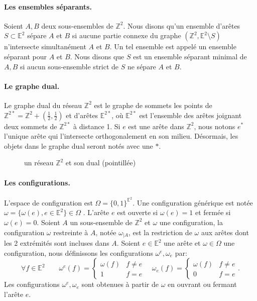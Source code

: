 \documentclass[titlepage,a4paper,12pt]{article}
\begin{document}
\paragraph{Les ensembles séparants.} Soient $A,B$ deux sous-ensembles de $\mathbb{Z}^2$. Nous disons qu'un ensemble d'arêtes $S\subset \mathbb{E}^2$ sépare $A$ et $B$ si aucune partie connexe du graphe $(\mathbb{Z}^2,\mathbb{E}^2 \setminus S)$ n'intersecte simultanément $A$ et $B$. Un tel ensemble est appelé un ensemble séparant pour $A$ et $B$. Nous disons que $S$ est un ensemble séparant minimal de $A,B$ si aucun sous-ensemble strict de $S$ ne sépare $A$ et $B$.

\paragraph{Le graphe dual.}Le graphe dual du réseau $\mathbb{Z}^2$ est le graphe de sommets les points de $ \mathbb{Z}^{2*} = \mathbb{Z}^2+(\frac{1}{2},\frac{1}{2})$ et d'arêtes $\mathbb{E}^{2*}$, où $\mathbb{E}^{2*}$ est l'ensemble des arêtes joignant deux sommets de $\mathbb{Z}^{2*}$ à distance 1. Si $e$ est une arête dans $\mathbb{Z}^2$, nous notons $e^*$ l'unique arête qui l'intersecte orthogonalement en son milieu. Désormais, les objets dans le graphe dual seront notés avec une $*$.
\begin{figure}[h]
\center
{}
\caption{un réseau $\mathbb{Z}^2$ et son dual (pointillée)}
\end{figure}

\paragraph{Les configurations.} L'espace de configuration est $\Omega = \{0,1\}^{\mathbb{E}^2}$. Une configuration générique est notée $\omega = \{\omega(e), e\in \mathbb{E}^2\} \in \Omega$ . L'arête $e$ est ouverte si $\omega(e) = 1$ et fermée si $\omega(e)= 0$. 
Soient $A$ un sous-ensemble de $\mathbb{Z}^2$ et $\omega$ une configuration, la configuration $\omega$ restreinte à $A$, notée $\omega_{\mid A}$, est la restriction de $\omega$ aux arêtes dont les 2 extrémités sont incluses dans $A$.
Soient $e\in \mathbb{E}^2$ une arête et $\omega\in \Omega$ une configuration, nous définissons les configurations $\omega^e,\omega_e$ par:
$$
 \forall f\in \mathbb{E}^2 \qquad\omega^e(f) = \left\lbrace \begin{array}{cc}
	\omega(f) & f\neq e \\
	1 & f=e 
 \end{array}\right. \quad
 \omega_e(f) = \left\lbrace \begin{array}{cc}
	\omega(f) & f\neq e \\
	0 & f=e
 \end{array}\right..
$$
Les configurations $\omega^e,\omega_e$ sont obtenues à partir de $\omega$ en ouvrant ou fermant l'arête $e$.
\end{document}

